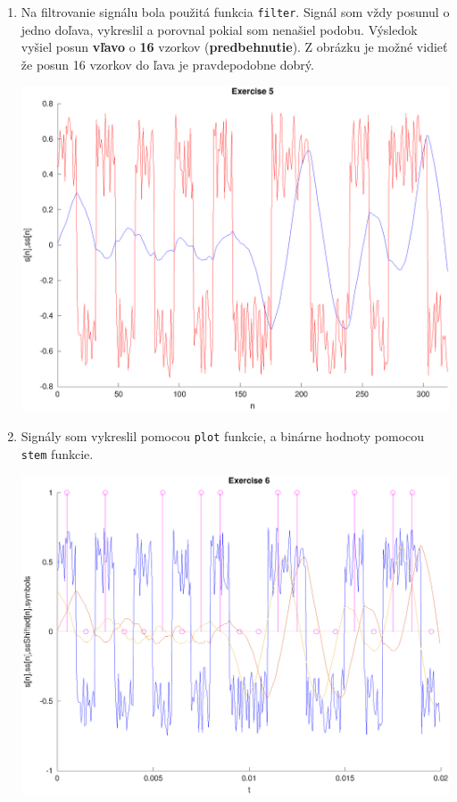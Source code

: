 \documentclass[11pt, a4paper,twocolumn]{article}
\begin{document}
\begin{enumerate}
    \item
    {
        Na filtrovanie signálu bola použitá funkcia \texttt{filter}. Signál som vždy posunul o jedno doľava, vykreslil a porovnal pokial som nenašiel podobu. Výsledok vyšiel posun \textbf{vľavo} o \textbf{16} vzorkov (\textbf{predbehnutie}). Z obrázku je možné vidieť že posun 16 vzorkov do ľava je pravdepodobne dobrý.
        \begin{center}
        \includegraphics[width=\linewidth,keepaspectratio]{include/5.eps}
        \end{center}
    }

    \item
    {
        Signály som vykreslil pomocou \texttt{plot} funkcie, a binárne hodnoty pomocou \texttt{stem} funkcie.
        \begin{center}
        \includegraphics[width=\linewidth,keepaspectratio]{include/6.eps}
        \end{center}
    }


\end{enumerate}
\end{document}
